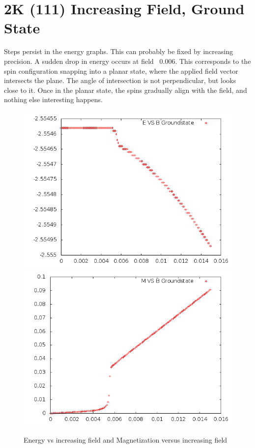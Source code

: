 \documentclass{article}
\begin{document}
\section{2K (111) Increasing Field, Ground State}
Steps persist in the energy graphs. This can probably be fixed by increasing precision. 
A sudden drop in energy occurs at field ~0.006. This corresponds to the spin configuration snapping
into a planar state, where the applied field vector intersects the plane. The angle of intersection
is not perpendicular, but looks close to it. Once in the planar state, the spins gradually align
with the field, and nothing else interesting happens. 
\begin{figure}[ht]
 \centering 
\includegraphics[scale=0.3]{111_2000/E000to005G.png}
\includegraphics[scale=0.3]{111_2000/M000to005G.png}
\caption{Energy vs increasing field and Magnetization versus increasing field}
\end{figure}
\end{document}
